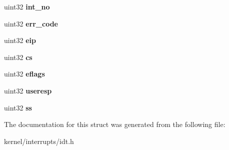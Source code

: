 \begin{DoxyCompactItemize}
\item 
\hypertarget{structregisters_afadd3a7e92865f4a39c222084541a641}{
uint32 {\bfseries int\_\-no}}
\label{structregisters_afadd3a7e92865f4a39c222084541a641}

\item 
\hypertarget{structregisters_ac97513133986d639baa5b49031b661cc}{
uint32 {\bfseries err\_\-code}}
\label{structregisters_ac97513133986d639baa5b49031b661cc}

\item 
\hypertarget{structregisters_a03c14a7c18730b4fa3fd60e9a2cfaf06}{
uint32 {\bfseries eip}}
\label{structregisters_a03c14a7c18730b4fa3fd60e9a2cfaf06}

\item 
\hypertarget{structregisters_adba99e37c71ff2f75a6c77d48be0a7ca}{
uint32 {\bfseries cs}}
\label{structregisters_adba99e37c71ff2f75a6c77d48be0a7ca}

\item 
\hypertarget{structregisters_aa4a09db03ac34c020ce8842b7724214d}{
uint32 {\bfseries eflags}}
\label{structregisters_aa4a09db03ac34c020ce8842b7724214d}

\item 
\hypertarget{structregisters_ad7233aa5c26fc03fddda95d96f7bd259}{
uint32 {\bfseries useresp}}
\label{structregisters_ad7233aa5c26fc03fddda95d96f7bd259}

\item 
\hypertarget{structregisters_a8e5909fb1d1fb5c5982513cffc2fd516}{
uint32 {\bfseries ss}}
\label{structregisters_a8e5909fb1d1fb5c5982513cffc2fd516}

\end{DoxyCompactItemize}


The documentation for this struct was generated from the following file:\begin{DoxyCompactItemize}
\item 
kernel/interrupts/idt.h\end{DoxyCompactItemize}
